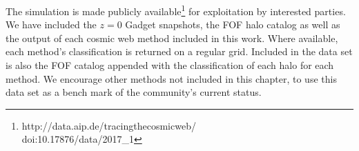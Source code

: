 The simulation is made publicly available\footnote{http://data.aip.de/tracingthecosmicweb/ \\  doi:10.17876/data/2017\_1} for exploitation by interested parties. We have included the $z=0$ Gadget snapshots, the FOF halo catalog as well as the output of each cosmic web method included in this work. Where available, each method's classification is returned on a regular grid. Included in the data set is also the FOF catalog appended with the classification of each halo for each method. We encourage other methods not included in this chapter, to use this data set as a bench mark of the community's current status.

